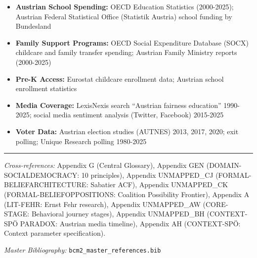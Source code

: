 \begin{itemize}[nosep]
\item \textbf{Austrian School Spending:} OECD Education Statistics (2000-2025); Austrian Federal
Statistical Office (Statistik Austria) school funding by Bundesland

\item \textbf{Family Support Programs:} OECD Social Expenditure Database (SOCX) childcare and family
transfer spending; Austrian Family Ministry reports (2000-2025)

\item \textbf{Pre-K Access:} Eurostat childcare enrollment data; Austrian school enrollment statistics

\item \textbf{Media Coverage:} LexisNexis search ``Austrian fairness education'' 1990-2025;
social media sentiment analysis (Twitter, Facebook) 2015-2025

\item \textbf{Voter Data:} Austrian election studies (AUTNES) 2013, 2017, 2020; exit polling;
Unique Research polling 1980-2025

\end{itemize}


\vspace{1em}
\hrule
\vspace{0.5em}

\noindent\textit{Cross-references:}
Appendix G (Central Glossary),
Appendix GEN (DOMAIN-SOCIALDEMOCRACY: 10 principles),
Appendix UNMAPPED_CJ (FORMAL-BELIEFARCHITECTURE: Sabatier ACF),
Appendix UNMAPPED_CK (FORMAL-BELIEFOPPOSITIONS: Coalition Possibility Frontier),
Appendix A (LIT-FEHR: Ernst Fehr research),
Appendix UNMAPPED_AW (CORE-STAGE: Behavioral journey stages),
Appendix UNMAPPED_BH (CONTEXT-SPÖ PARADOX: Austrian media timeline),
Appendix AH (CONTEXT-SPÖ: Context parameter specification).

\noindent\textit{Master Bibliography:} \texttt{bcm2\_master\_references.bib}

